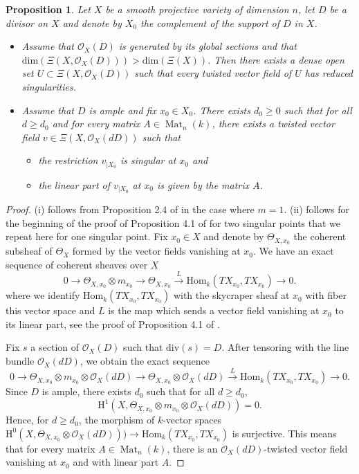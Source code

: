 \documentclass[12pt]{amsart}
\DeclareMathOperator{\Mat}{Mat}
\theoremstyle{definition}
\theoremstyle{plain}
\newtheorem{proposition}[definition]{Proposition}
\theoremstyle{exampstyle}
\theoremstyle{exampstyle}\newtheorem{thmxbis}{Theorem}
\numberwithin{equation}{section}
\theoremstyle{remark}
\begin{document}
\begin{proposition} \label{proposition-singularlocus}
Let $X$ be a smooth projective variety of dimension $n$, let $D$ be a divisor on $X$ and denote by $X_0$ the complement of the support of $D$ in $X$. 

\begin{itemize} 
\item[(i)] Assume that $\mathcal O_X(D)$ is generated by its global sections and that $\mathrm{dim}(\Xi(X,\mathcal O_X(D))) > \mathrm{dim}(\Xi(X))$. Then there exists a dense open set $U \subset \Xi(X,\mathcal O_X(D))$ such that every twisted vector field of $U$ has reduced singularities.  

\item[(ii)]  Assume that $D$ is ample and fix $x_0 \in X_0$. There exists $d_0 \geq 0$ such that for all $d \geq d_0$ and for every matrix $A \in \Mat_n(k)$, there exists a twisted vector field $v \in \Xi(X,\mathcal O_X(dD))$ such that 

\begin{itemize}
\item the restriction $v_{\mid X_0}$ is singular at $x_0$ and 
\item the linear part of $v_{\mid X_0}$  at $x_0$ is given by the matrix $A$.
\end{itemize}
\end{itemize}   
\end{proposition}

\begin{proof} 
(i) follows from Proposition 2.4 of \cite{Coutinho-Pereira} in the case where $m = 1$. (ii) follows for the beginning of the proof of Proposition 4.1 of \cite{Coutinho-Pereira} for two singular points that we repeat here for one singular point.  Fix $x_0 \in X$ and denote by $\Theta_{X,x_0}$ the coherent subsheaf of $\Theta_X$ formed by the vector fields vanishing at $x_0$. We have an exact sequence of coherent sheaves over $X$ 
$$ 0 \rightarrow \Theta_{X,x_0} \otimes m_{x_0} \rightarrow \Theta_{X,x_0} \overset{L}{\rightarrow} \mathrm{Hom}_k(TX_{x_0}, TX_{x_0}) \rightarrow 0.$$ 
where we identify $\mathrm{Hom}_k(TX_{x_0}, TX_{x_0})$ with the skycraper sheaf at $x_0$ with fiber this vector space and $L$ is the map which sends a vector field vanishing at $x_0$ to its linear part, see the proof of Proposition 4.1 of \cite{Coutinho-Pereira}.

Fix $s$ a section of $\mathcal  O_X(D)$ such that $\mathrm{div}(s) = D$. After tensoring with the line bundle $\mathcal O_X(dD)$, we obtain  the exact sequence
$$ 0 \rightarrow \Theta_{X,x_0} \otimes m_{x_0} \otimes \mathcal O_X(dD) \rightarrow \Theta_{X,x_0} \otimes \mathcal O_X(dD) \overset{L}{\rightarrow} \mathrm{Hom}_k(TX_{x_0}, TX_{x_0}) \rightarrow 0.$$ 
Since $D$ is ample, there exists $d_0$ such that for all $d \geq d_0$, 
$$\mathrm{H}^1(X, \Theta_{X,x_0} \otimes m_{x_0} \otimes \mathcal O_X(dD)) = 0.$$
Hence, for $d \geq d_0$, the morphism of $k$-vector spaces 
$\mathrm{H}^0(X, \Theta_{X,x_0} \otimes \mathcal O_X(dD))) \rightarrow \mathrm{Hom}_k(TX_{x_0}, TX_{x_0})$ is surjective.
This means that for every matrix $A \in \Mat_n(k)$, there is an $\mathcal O_X(dD)$-twisted vector field vanishing at $x_0$ and with linear part $A$. 
\end{proof}
\end{document}
